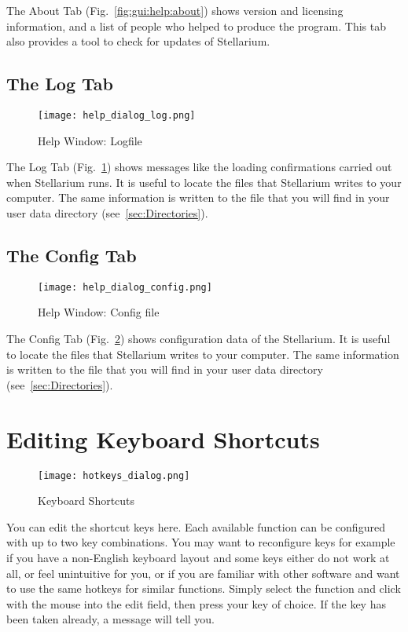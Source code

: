 The About Tab (Fig.~\ref{fig:gui:help:about}) shows version and licensing information, and a list of people who helped to produce the program.
This tab  also provides a tool to check for updates of Stellarium.

\subsection{The Log Tab}
\label{sec:gui:help:log}
\begin{figure}[tbp]
\centering\texttt{[image: help\_dialog\_log.png]}
\caption{Help Window: Logfile}
\label{fig:gui:help:log}
\end{figure}

The Log Tab (Fig.~\ref{fig:gui:help:log}) shows messages like the loading confirmations carried out when
Stellarium runs. It is useful to locate the files that Stellarium writes
to your computer. The same information is written to  the file  that you will
find in your user data directory (see~\ref{sec:Directories}).

\subsection{The Config Tab}
\label{sec:gui:help:config}
\begin{figure}[tbp]
	\centering\texttt{[image: help\_dialog\_config.png]}
	\caption{Help Window: Config file}
	\label{fig:gui:help:config}
\end{figure}

The Config Tab (Fig.~\ref{fig:gui:help:config}) shows configuration data of the Stellarium. It is useful to locate the files that Stellarium writes
to your computer. The same information is written to  the file  that you will
find in your user data directory (see~\ref{sec:Directories}).

\clearpage
\section{Editing Keyboard Shortcuts}
\label{sec:gui:help:hotkeys}

\begin{figure}[htbp]
\centering\texttt{[image: hotkeys\_dialog.png]}
\caption{Keyboard Shortcuts}
\label{fig:gui:hotkeys}
\end{figure}

You can edit the shortcut keys here. Each available function can be
configured with up to two key combinations. You may want to
reconfigure keys for example if you have a non-English keyboard layout
and some keys either do not work at all, or feel unintuitive for you,
or if you are familiar with other software and want to use the same
hotkeys for similar functions. Simply select the function and click
with the mouse into the edit field, then press your key of choice. If
the key has been taken already, a message will tell you.

